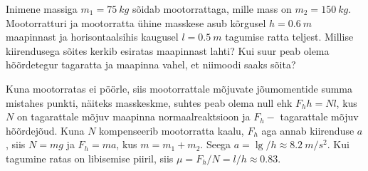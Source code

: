 
Inimene massiga $m_{1}=\SI{75}{kg}$ sõidab mootorrattaga, mille mass on $m_{2}=\SI{150}{kg}$. Mootorratturi ja mootorratta ühine masskese asub kõrgusel $h=\SI{0,6}{m}$ maapinnast ja horisontaalsihis kaugusel $l=\SI{0,5}{m}$ tagumise ratta teljest. Millise kiirendusega sõites kerkib esiratas maapinnast lahti? Kui suur peab olema hõõrdetegur tagaratta ja maapinna vahel, et niimoodi saaks sõita?

\hint

\solu
Kuna mootorratas ei pöörle, siis mootorrattale mõjuvate jõumomentide summa mistahes punkti, näiteks masskeskme, suhtes peab olema null ehk $F_{h} h=N l$, kus $N$ on tagarattale mõjuv maapinna normaalreaktsioon ja $F_{h}-$ tagarattale mõjuv hõõrdejõud. Kuna $N$ kompenseerib mootorratta kaalu, $F_{h}$ aga annab kiirenduse $a$, siis $N=m g$ ja $F_{h}=m a$, kus $m=m_{1}+m_{2}$. Seega $a=\lg / h \approx\SI{8,2}{m/s^2}$. Kui
tagumine ratas on libisemise piiril, siis $\mu=F_{h} / N=l / h \approx \num{0,83}$.

\probend